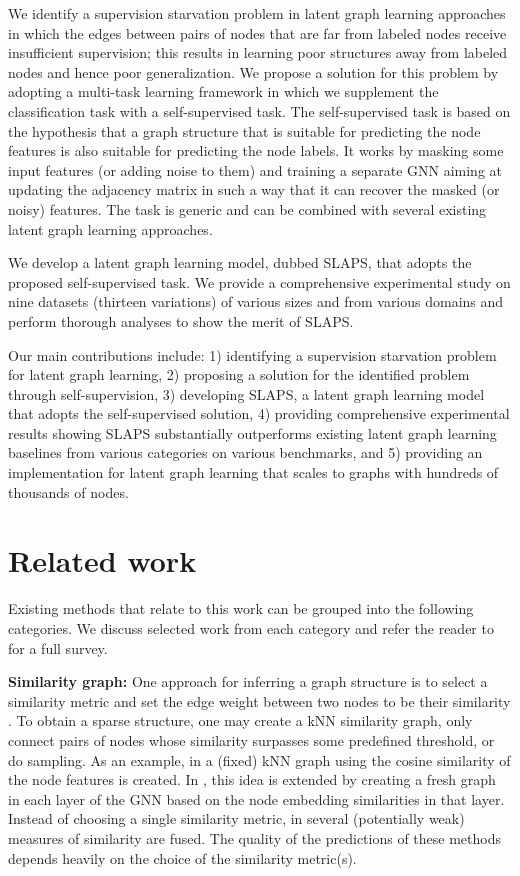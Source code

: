 \documentclass{article}
\begin{document}
We identify a supervision starvation problem in latent graph learning approaches in which the edges between pairs of nodes that are far from labeled nodes receive insufficient supervision; this results in learning poor structures away from labeled nodes and hence poor generalization. We propose a solution for this problem by adopting a multi-task learning framework in which we supplement the classification task with a self-supervised task. The self-supervised task is based on the hypothesis that a graph structure that is suitable for predicting the node features is also suitable for predicting the node labels. It works by masking some input features (or adding noise to them) and training a separate GNN aiming at updating the adjacency matrix in such a way that it can recover the masked (or noisy) features. The task is generic and can be combined with several existing latent graph learning approaches. 

We develop a latent graph learning model, dubbed SLAPS, that adopts the proposed self-supervised task. We provide a comprehensive experimental study on nine datasets (thirteen variations) of various sizes and from various domains and perform thorough analyses to show the merit of SLAPS.

Our main contributions include: 
1) identifying a supervision starvation problem for latent graph learning, 
2) proposing a solution for the identified problem through self-supervision, 
3) developing SLAPS, a latent graph learning model that adopts the self-supervised solution, 
4) providing comprehensive experimental results showing SLAPS substantially outperforms existing latent graph learning baselines from various categories on various benchmarks, and 
5) providing an implementation for latent graph learning that scales to graphs with hundreds of thousands of nodes.

\section{Related work} \label{sec:rel-work}
Existing methods that relate to this work can be grouped into the following categories. We discuss selected work from each category and refer the reader to \cite{zhu2021deep} for a full survey.

\textbf{Similarity graph:}
One approach for inferring a graph structure is to select a similarity metric and set the edge weight between two nodes to be their similarity \citep{roweis2000nonlinear,tenenbaum2000global,belkin2006manifold}. To obtain a sparse structure, one may create a kNN similarity graph, only connect pairs of nodes whose similarity surpasses some predefined threshold, or do sampling. As an example, in \cite{gidaris2019generating} a (fixed) kNN graph using the cosine similarity of the node features is created.
In \cite{DGCNN}, this idea is extended by creating a fresh graph in each layer of the GNN based on the node embedding similarities in that layer. Instead of choosing a single similarity metric, in \cite{halcrow2020grale} several (potentially weak) measures of similarity are fused.
The quality of the predictions of these methods depends heavily on the choice of the similarity metric(s).
\end{document}
